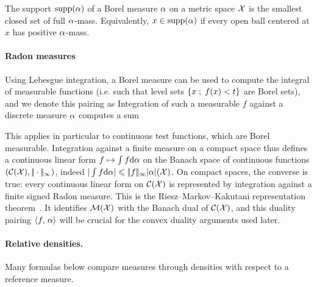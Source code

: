 \begin{defn}\label{def:support}
	The support $\operatorname{supp}(\alpha)$ of a Borel measure $\alpha$ on a metric space $\mathcal{X}$ is the smallest closed set of full $\alpha$-mass. Equivalently, $x\in\operatorname{supp}(\alpha)$ if every open ball centered at $x$ has positive $\alpha$-mass.
\end{defn}


\paragraph{Radon measures}

Using Lebesgue integration, a Borel measure can be used to compute the integral of measurable functions (i.e. such that level sets $\left\{ x \;;\; f(x) < t \right\}$ are Borel sets), and we denote this pairing as
Integration of such a measurable $f$ against a discrete measure $\alpha$ computes a sum


This applies in particular to continuous test functions, which are Borel measurable.
%
Integration against a finite measure on a compact space thus defines a continuous linear form $f \mapsto \int f \mathrm{d}\alpha$ on the Banach space of continuous functions $(\mathcal{C}(\mathcal{X}),|\!| \cdot |\!|_\infty)$, indeed $|\int f \mathrm{d}\alpha| \leqslant |\!| f |\!|_\infty |\alpha|(\mathcal{X})$. On compact spaces, the converse is true: every continuous linear form on $\mathcal{C}(\mathcal{X})$ is represented by integration against a finite signed Radon measure. This is the Riesz--Markov--Kakutani representation theorem~\cite{rudin1987realcomplex,bogachev2007measure}. It identifies $\mathcal{M}(\mathcal{X})$ with the Banach dual of $\mathcal{C}(\mathcal{X})$, and this duality pairing $\langle f,\,\alpha\rangle$ will be crucial for the convex duality arguments used later.

\paragraph{Relative densities.}

Many formulas below compare measures through densities with respect to a reference measure.


